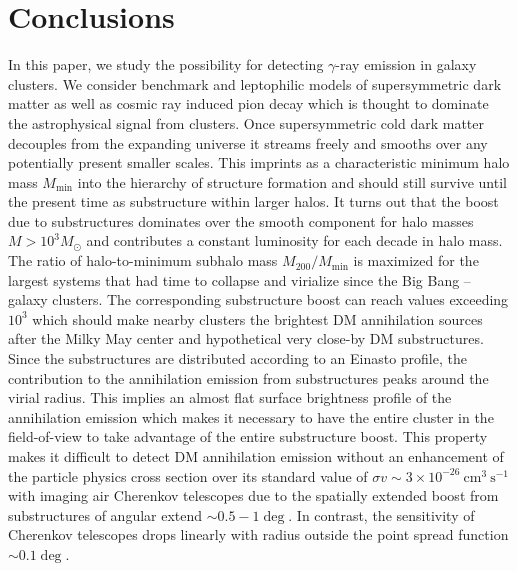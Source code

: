 \documentclass[10pt,aps,pra,reprint,amsmath,amsfonts,amssymb,showpacs]{revtex4-1}
\newcommand{\msun}{M_\odot}
\begin{document}
%



\section{Conclusions}

In this paper, we study the possibility for detecting $\gamma$-ray emission in
galaxy clusters. We consider benchmark and leptophilic models of supersymmetric
dark matter as well as cosmic ray induced pion decay which is thought to
dominate the astrophysical signal from clusters. Once supersymmetric cold dark
matter decouples from the expanding universe it streams freely and smooths over
any potentially present smaller scales. This imprints as a characteristic
minimum halo mass $M_\mathrm{min}$ into the hierarchy of structure formation and
should still survive until the present time as substructure within larger
halos. It turns out that the boost due to substructures dominates over the
smooth component for halo masses $M>10^3 \msun$ and contributes a constant
luminosity for each decade in halo mass. The ratio of halo-to-minimum subhalo
mass $M_{200}/M_\mathrm{min}$ is maximized for the largest systems that had time
to collapse and virialize since the Big Bang -- galaxy clusters. The
corresponding substructure boost can reach values exceeding $10^3$ which should
make nearby clusters the brightest DM annihilation sources after the Milky May
center and hypothetical very close-by DM substructures. Since the substructures
are distributed according to an Einasto profile, the contribution to the
annihilation emission from substructures peaks around the virial radius. This
implies an almost flat surface brightness profile of the annihilation emission
which makes it necessary to have the entire cluster in the field-of-view to take
advantage of the entire substructure boost.  This property makes it difficult to
detect DM annihilation emission without an enhancement of the particle physics
cross section over its standard value of $\sigma v\sim 3\times 10^{-26}
~\mathrm{cm}^3~\mathrm{s}^{-1}$ with imaging air Cherenkov telescopes due to the
spatially extended boost from substructures of angular extend $\sim
0.5-1\deg$. In contrast, the sensitivity of Cherenkov telescopes drops linearly
with radius outside the point spread function $\sim0.1\deg$.
\end{document}
